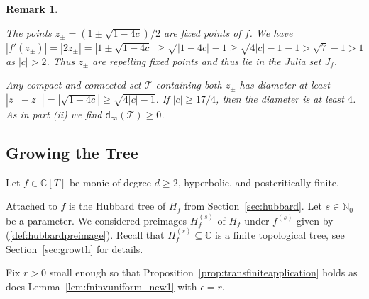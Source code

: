\documentclass[12pt,oneside,a4]{amsart}
\newcommand{\IC}{\mathbb{C}}
\newcommand{\IN}{\mathbb{N}}
\newcommand{\cT}{\mathcal{T}}
\newcounter{maincounter}
\numberwithin{maincounter}{section}
\numberwithin{equation}{section}
\newtheorem{remark}[maincounter]{Remark}
\renewcommand{\subset}{\subseteq}
\begin{document}
\begin{remark}
\begin{enumerate}
      The points $z_{\pm} = (1\pm \sqrt{1-4c})/2$ are fixed points of $f$. We
      have $|f'(z_{\pm})|=|2z_{\pm}|=|1\pm \sqrt{1-4c}|\ge \sqrt{|1-4c|}-1 \ge
      \sqrt{4|c|-1}-1>\sqrt 7 -1>1$ as $|c|>2$. Thus $z_{\pm}$ are repelling
      fixed points and thus lie in the Julia set $J_f$. 

      Any compact and connected set $\cT$ containing both $z_{\pm}$
      has diameter at least $|z_+-z_-|=|\sqrt{1-4c}|\ge
      \sqrt{4|c|-1}$. If $|c|\ge 17/4$, then the diameter is at least
      $4$. As in part (ii) we find $\mathsf{d}_\infty(\cT)\ge
      0$. 
  \end{enumerate}
\end{remark}

\subsection{Growing the Tree}

Let $f\in \IC[T]$ be monic of degree $d\ge 2$, hyperbolic, and
postcritically finite.

Attached to $f$ is the Hubbard tree of $H_f$ from
Section~\ref{sec:hubbard}. Let $s\in\IN_0$ be a parameter. We
considered preimages $H_f^{(s)}$ of $H_f$ under $f^{(s)}$ given by
(\ref{def:hubbardpreimage}). Recall that $H_f^{(s)}\subset\IC$ is a
finite topological tree, see Section~\ref{sec:growth} for details.

Fix $r > 0$ small enough so that
Proposition~\ref{prop:transfiniteapplication} holds as does
Lemma~\ref{lem:fninvuniform_new1} with $\epsilon=r$.
\end{document}
